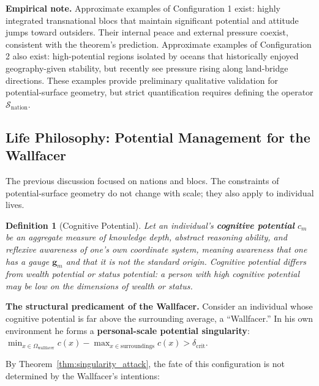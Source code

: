 \documentclass[12pt,a4paper]{article}
\newtheorem{definition}[theorem]{Definition}
\theoremstyle{remark}
\begin{document}
\textbf{Empirical note.} Approximate examples of Configuration 1 exist: highly integrated transnational blocs that maintain significant potential and attitude jumps toward outsiders. Their internal peace and external pressure coexist, consistent with the theorem's prediction. Approximate examples of Configuration 2 also exist: high-potential regions isolated by oceans that historically enjoyed geography-given stability, but recently see pressure rising along land-bridge directions. These examples provide preliminary qualitative validation for potential-surface geometry, but strict quantification requires defining the operator $\mathcal{S}_{\text{nation}}$.

\subsection{Life Philosophy: Potential Management for the Wallfacer}

The previous discussion focused on nations and blocs. The constraints of potential-surface geometry do not change with scale; they also apply to individual lives.

\begin{definition}[Cognitive Potential]\label{def:cognitive_potential}
Let an individual's \textbf{cognitive potential} $c_m$ be an aggregate measure of knowledge depth, abstract reasoning ability, and reflexive awareness of one's own coordinate system, meaning awareness that one has a gauge $\mathbf{g}_m$ and that it is not the standard origin. Cognitive potential differs from wealth potential or status potential: a person with high cognitive potential may be low on the dimensions of wealth or status.
\end{definition}

\textbf{The structural predicament of the Wallfacer.} Consider an individual whose cognitive potential is far above the surrounding average, a ``Wallfacer.'' In his own environment he forms a \textbf{personal-scale potential singularity}: $\min_{x \in \Omega_{\text{wallfacer}}} c(x) - \max_{x \in \text{surroundings}} c(x) > \delta_{\text{crit}}$.

By Theorem~\ref{thm:singularity_attack}, the fate of this configuration is not determined by the Wallfacer's intentions:
\end{document}
